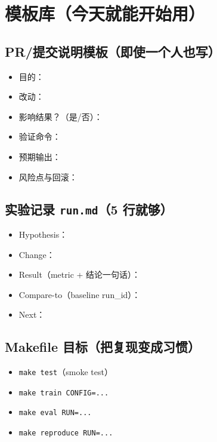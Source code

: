 \chapter{模板库（今天就能开始用）}
\label{app:templates}
\section{PR/提交说明模板（即使一个人也写）}
\begin{itemize}
  \item 目的：
  \item 改动：
  \item 影响结果？（是/否）：
  \item 验证命令：
  \item 预期输出：
  \item 风险点与回滚：
\end{itemize}

\section{实验记录 \texttt{run.md}（5 行就够）}
\begin{itemize}
  \item Hypothesis：
  \item Change：
  \item Result（metric + 结论一句话）：
  \item Compare-to（baseline run\_id）：
  \item Next：
\end{itemize}

\section{Makefile 目标（把复现变成习惯）}
\begin{itemize}
  \item \texttt{make test}（smoke test）
  \item \texttt{make train CONFIG=...}
  \item \texttt{make eval RUN=...}
  \item \texttt{make reproduce RUN=...}
\end{itemize}